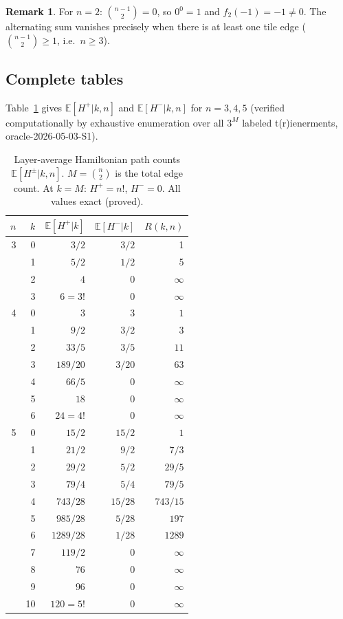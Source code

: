 \documentclass[12pt,reqno]{amsart}
\theoremstyle{definition}
\newtheorem{remark}[theorem]{Remark}
\theoremstyle{plain}
\begin{document}
\begin{remark}
For $n=2$: $\binom{n-1}{2}=0$, so $0^0=1$ and $f_2(-1)=-1\ne 0$.
The alternating sum vanishes precisely when there is at least one tile edge
($\binom{n-1}{2}\ge 1$, i.e.\ $n\ge 3$).
\end{remark}

\subsection{Complete tables}

Table~\ref{tab:EH-table} gives $\mathbb{E}[H^+|k,n]$ and $\mathbb{E}[H^-|k,n]$
for $n=3,4,5$ (verified computationally by exhaustive enumeration over all
$3^M$ labeled t(r)ienerments, oracle-2026-05-03-S1).

\begin{table}[ht]
\centering
\caption{Layer-average Hamiltonian path counts $\mathbb{E}[H^\pm|k,n]$.
  $M=\binom{n}{2}$ is the total edge count.  At $k=M$: $H^+=n!$, $H^-=0$.
  All values exact (proved).}
\label{tab:EH-table}
\small
\begin{tabular}{r r r r r}
\toprule
$n$ & $k$ & $\mathbb{E}[H^+|k]$ & $\mathbb{E}[H^-|k]$ & $R(k,n)$\\
\midrule
3 & 0 & $3/2$ & $3/2$ & 1\\
  & 1 & $5/2$ & $1/2$ & 5\\
  & 2 & $4$   & $0$   & $\infty$\\
  & 3 & $6=3!$& $0$   & $\infty$\\
\midrule
4 & 0 & $3$     & $3$    & $1$\\
  & 1 & $9/2$   & $3/2$  & $3$\\
  & 2 & $33/5$  & $3/5$  & $11$\\
  & 3 & $189/20$& $3/20$ & $63$\\
  & 4 & $66/5$  & $0$    & $\infty$\\
  & 5 & $18$    & $0$    & $\infty$\\
  & 6 & $24=4!$ & $0$    & $\infty$\\
\midrule
5 & 0 & $15/2$    & $15/2$  & $1$\\
  & 1 & $21/2$    & $9/2$   & $7/3$\\
  & 2 & $29/2$    & $5/2$   & $29/5$\\
  & 3 & $79/4$    & $5/4$   & $79/5$\\
  & 4 & $743/28$  & $15/28$ & $743/15$\\
  & 5 & $985/28$  & $5/28$  & $197$\\
  & 6 & $1289/28$ & $1/28$  & $1289$\\
  & 7 & $119/2$   & $0$     & $\infty$\\
  & 8 & $76$      & $0$     & $\infty$\\
  & 9 & $96$      & $0$     & $\infty$\\
  & 10& $120=5!$  & $0$     & $\infty$\\
\bottomrule
\end{tabular}
\end{table}
\end{document}
